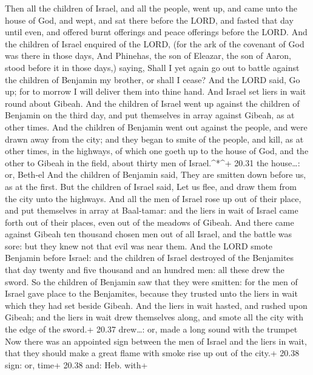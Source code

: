 Then all the children of Israel, and all the people, went
up, and came unto the house of God, and wept, and sat there before the
LORD, and fasted that day until even, and offered burnt offerings and
peace offerings before the LORD.  And the children of
Israel enquired of the LORD, (for the ark of the covenant of God was
there in those days,  And Phinehas, the son of Eleazar, the
son of Aaron, stood before it in those days,) saying, Shall I yet again
go out to battle against the children of Benjamin my brother, or shall I
cease? And the LORD said, Go up; for to morrow I will deliver them into
thine hand.  And Israel set liers in wait round about
Gibeah.  And the children of Israel went up against the
children of Benjamin on the third day, and put themselves in array
against Gibeah, as at other times.  And the children of
Benjamin went out against the people, and were drawn away from the city;
and they began to smite of the people, and kill, as at other times, in
the highways, of which one goeth up to the house of God, and the other
to Gibeah in the field, about thirty men of Israel.\^{}*\^{}+ 20.31 the
house\ldots: or, Beth-el  And the children of Benjamin
said, They are smitten down before us, as at the first. But the children
of Israel said, Let us flee, and draw them from the city unto the
highways.  And all the men of Israel rose up out of their
place, and put themselves in array at Baal-tamar: and the liers in wait
of Israel came forth out of their places, even out of the meadows of
Gibeah.  And there came against Gibeah ten thousand chosen
men out of all Israel, and the battle was sore: but they knew not that
evil was near them.  And the LORD smote Benjamin before
Israel: and the children of Israel destroyed of the Benjamites that day
twenty and five thousand and an hundred men: all these drew the sword.
 So the children of Benjamin saw that they were smitten:
for the men of Israel gave place to the Benjamites, because they trusted
unto the liers in wait which they had set beside Gibeah. 
And the liers in wait hasted, and rushed upon Gibeah; and the liers in
wait drew themselves along, and smote all the city with the edge of the
sword.+ 20.37 drew\ldots: or, made a long sound with the trumpet
 Now there was an appointed sign between the men of Israel
and the liers in wait, that they should make a great flame with smoke
rise up out of the city.+ 20.38 sign: or, time+ 20.38 and: Heb. with+
